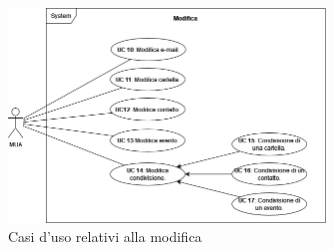 \begin{figure}[H]
    \includegraphics[width=0.75\textwidth]{sections/uc_imgs/UC-modifica.png}
    \centering
    \caption{Casi d'uso relativi alla modifica}
\end{figure}

